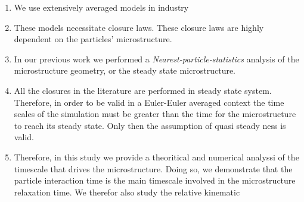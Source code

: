 




\begin{enumerate}
    \item We use extensively averaged models in industry 
    \item These models necessitate closure laws. These closure laws are highly dependent on the particles' microstructure. 
    \item In our previous work we performed a \textit{Nearest-particle-statistics} analysis of the microstructure geometry, or the steady state microstructure. 
    \item All the closures in the literature are performed in steady state system. 
    Therefore, in order to be valid in a Euler-Euler averaged context the time scales of the simulation must be greater than the time for the microstructure to reach its steady state. 
    Only then the assumption of quasi steady ness is valid.    
    \item Therefore, in this study we provide a theoritical and numerical analyssi of the timescale that drives the microstructure. 
    Doing so, we demonstrate that the particle interaction time is the main timescale involved in the microstructure relaxation time. 
    We therefor also study the relative kinematic
\end{enumerate}